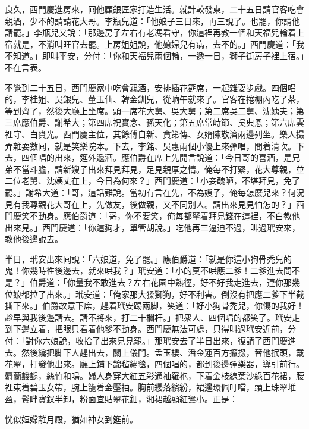 良久，西門慶進房來，囘他顧銀匠家打造生活。就計較發柬，二十五日請官客吃會親酒，少不的請請花大哥。李瓶兒道：「他娘子三日來，再三說了。也罷，你請他請罷。」李瓶兒又說：「那邊房子左右有老馮看守，你這裡再教一個和天福兒輪着上宿就是，不消叫旺官去罷。上房姐姐說，他媳婦兒有病，去不的。」{}西門慶道：「我不知道。」即叫平安，分付：「你和天福兒兩個輪，一遞一日，獅子街房子裡上宿。」不在言表。

不覺到二十五日，西門慶家中吃會親酒，安排插花筵席，一起雜耍步戲。四個唱的，李桂姐、吳銀兒、董玉仙、韓金釧兒，從晌午就來了。官客在捲棚內吃了茶，等到齊了，然後大廳上坐席。頭一席花大舅、吳大舅；第二席吳二舅、沈姨夫；第三席應伯爵、謝希大；第四席祝實念、孫天化；第五席常峙節、吳典恩；第六席雲裡守、白賚光。西門慶主位，其餘傅自新、賁第傳、女婿陳敬濟兩邊列坐。樂人撮弄雜耍數囘，就是笑樂院本。下去，李銘、吳惠兩個小優上來彈唱，間着清吹。下去，四個唱的出來，筵外遞酒。應伯爵在席上先開言說道：「今日哥的喜酒，是兄弟不當斗膽，請新嫂子出來拜見拜見，足見親厚之情。俺每不打緊，花大尊親，並二位老舅、沈姨丈在上，今日為何來？」西門慶道：「小妾醜陋，不堪拜見，免了罷。」謝希大道：「哥，這話難說。當初有言在先，不為嫂子，俺每怎麼兒來？何況見有我尊親花大哥在上，先做友，後做親，又不同別人。請出來見見怕怎的？」西門慶笑不動身。應伯爵道：「哥，你不要笑，俺每都拏着拜見錢在這裡，不白教他出來見。」西門慶道：「你這狗才，單管胡說。」吃他再三逼迫不過，叫過玳安來，教他後邊說去。

半日，玳安出來囘說：「六娘道，免了罷。」應伯爵道：「就是你這小狗骨禿兒的鬼！你幾時徃後邊去，就來哄我？」玳安道：「小的莫不哄應二爹！二爹進去問不是？」伯爵道：「你量我不敢進去？左右花園中熟徑，好不好我走進去，連你那幾位娘都拉了出來。」玳安道：「俺家那大猱獅狗，好不利害。倒沒有把應二爹下半截撕下來。」伯爵故意下席，趕着玳安踢兩脚，笑道：「好小狗骨禿兒，你傷的我好！趁早與我後邊請去。請不將來，打二十欄杆。」把衆人、四個唱的都笑了。玳安走到下邊立着，把眼只看着他爹不動身。西門慶無法可處，只得叫過玳安近前，分付：「對你六娘說，收拾了出來見見罷。」那玳安去了半日出來，復請了西門慶進去。然後纔把脚下人趕出去，關上儀門。孟玉樓、潘金蓮百方攛掇，替他抿頭，戴花翠，打發他出來。廳上鋪下錦毡繡毯，四個唱的，都到後邊彈樂器，導引前行。麝蘭靉靆，絲竹和鳴。婦人身穿大紅五彩通袖羅袍，下着金枝線葉沙綠百花裙，腰裡束着碧玉女帶，腕上籠着金壓袖。胸前纓落繽紛，裙邊環佩叮噹，頭上珠翠堆盈，鬂畔寶釵半卸，粉面宜貼翠花鈿，湘裙越顯紅鴛小。正是：

\begin{myquote} 
恍似姮嫦離月殿，猶如神女到筵前。
\end{myquote} 

